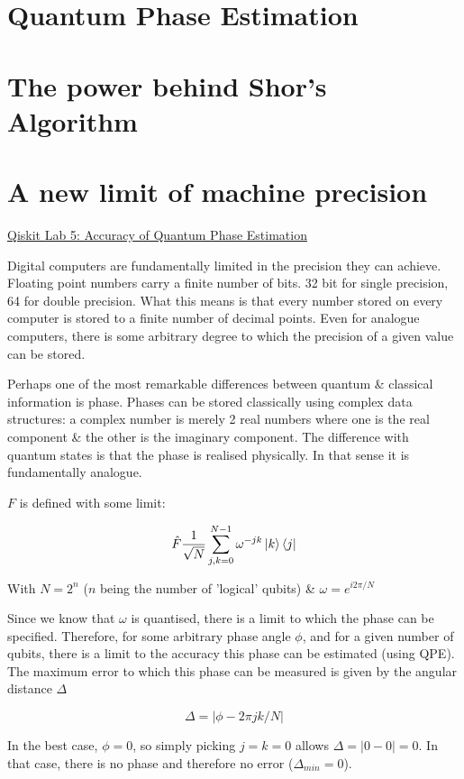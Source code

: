 \documentclass{book}
\begin{document}
\section{Quantum Phase Estimation}
\section{The power behind Shor's Algorithm}
\section{A new limit of machine precision}

\href{https://learn.qiskit.org/course/ch-labs/lab-5-accuracy-of-quantum-phase-estimation}{Qiskit Lab 5: Accuracy of Quantum Phase Estimation}

Digital computers are fundamentally limited in the precision they can achieve. Floating point numbers carry a finite number of bits. 32 bit for single precision, 64 for double precision. What this means is that every number stored on every computer is stored to a finite number of decimal points. Even for analogue computers, there is some arbitrary degree to which the precision of a given value can be stored. 

Perhaps one of the most remarkable differences between quantum \& classical information is phase. Phases can be stored classically using complex data structures: a complex number is merely 2 real numbers where one is the real component \& the other is the imaginary component. The difference with quantum states is that the phase is realised physically. In that sense it is fundamentally analogue. 

$F$ is defined with some limit:

$$ \hat{F} \frac{1}{\sqrt{N}}\sum_{j,k = 0}^{N-1} \omega^{-jk}\ket{k}\bra{j}$$

With $ N = 2^n$ ($n$ being the number of 'logical' qubits) \& $\omega = e^{i2\pi/N}$

Since we know that $\omega$ is quantised, there is a limit to which the phase can be specified. Therefore, for some arbitrary phase angle $\phi$, and for a given number of qubits, there is a limit to the accuracy this phase can be estimated (using QPE). The maximum error to which this phase can be measured is given by the angular distance $\Delta$

$$ \Delta = | \phi - 2\pi jk/N | $$

In the best case, $\phi = 0 $, so simply picking $ j = k = 0 $ allows $\Delta = | 0 - 0 | = 0 $. In that case, there is no phase and therefore no error ($\Delta_{min} = 0$). 
\end{document}
